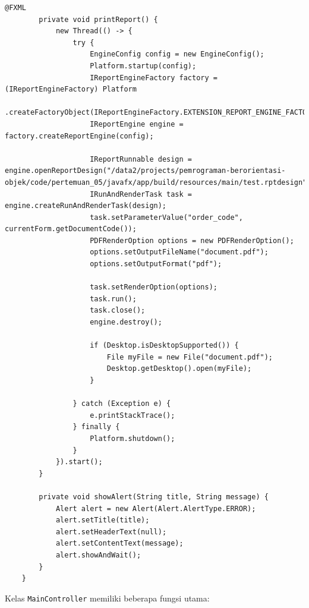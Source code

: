 \begin{lstlisting}[style=JavaStyle]
		@FXML
		private void printReport() {
			new Thread(() -> {
				try {
					EngineConfig config = new EngineConfig();
					Platform.startup(config);
					IReportEngineFactory factory = (IReportEngineFactory) Platform
					.createFactoryObject(IReportEngineFactory.EXTENSION_REPORT_ENGINE_FACTORY);
					IReportEngine engine = factory.createReportEngine(config);
					
					IReportRunnable design = engine.openReportDesign("/data2/projects/pemrograman-berorientasi-objek/code/pertemuan_05/javafx/app/build/resources/main/test.rptdesign");
					IRunAndRenderTask task = engine.createRunAndRenderTask(design);
					task.setParameterValue("order_code", currentForm.getDocumentCode());
					PDFRenderOption options = new PDFRenderOption();
					options.setOutputFileName("document.pdf");
					options.setOutputFormat("pdf");
					
					task.setRenderOption(options);
					task.run();
					task.close();
					engine.destroy();
					
					if (Desktop.isDesktopSupported()) {
						File myFile = new File("document.pdf");
						Desktop.getDesktop().open(myFile);
					}
					
				} catch (Exception e) {
					e.printStackTrace();
				} finally {
					Platform.shutdown();
				}
			}).start();
		}
		
		private void showAlert(String title, String message) {
			Alert alert = new Alert(Alert.AlertType.ERROR);
			alert.setTitle(title);
			alert.setHeaderText(null);
			alert.setContentText(message);
			alert.showAndWait();
		}
	}
\end{lstlisting}

Kelas \texttt{MainController} memiliki beberapa fungsi utama:

